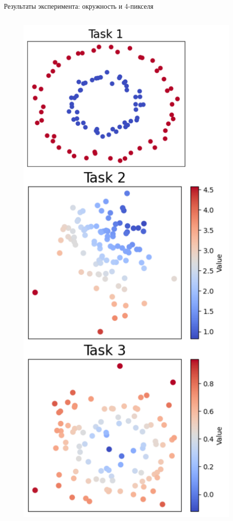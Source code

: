 \documentclass{beamer}
\begin{document}
\begin{frame}{Результаты эксперимента: окружность и 4-пикселя}
\begin{columns}[c]
\begin{figure}
    \includegraphics[scale=0.23]{circles.drawio.pdf}
\end{figure}
\end{columns}
\end{frame}
\end{document}
